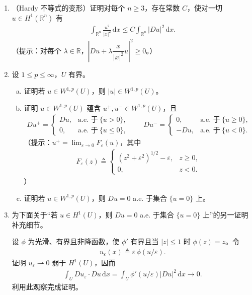 \documentclass[../../main.tex]{subfiles}
\begin{document}
\begin{enumerate}
\item （Hardy 不等式的变形）证明对每个 $n\geqslant 3$，存在常数 $C$，使对一切 $u\in H^{1}(\mathbb{R}^{n})$ 有
\begin{align*}
\int_{\mathbb{R}^{n}}\frac{u^{2}}{|x|^{2}}\,\mathrm{d}x\leqslant C\int_{\mathbb{R}^{n}}|Du|^{2}\,\mathrm{d}x.
\end{align*}
（提示：对每个 $\lambda\in\mathbb{R}$，$|Du+\lambda\dfrac{x}{|x|^{2}}u|^{2}\geqslant 0$。）

\item 设 $1\leqslant p\leqslant\infty$，$U$ 有界。
\begin{enumerate}[(a)]
\item 证明若 $u\in W^{1,p}(U)$，则 $|u|\in W^{1,p}(U)$。
\item 证明 $u\in W^{1,p}(U)$ 蕴含 $u^{+},u^{-}\in W^{1,p}(U)$，且
\begin{align*}
Du^{+}=
\begin{cases}
Du, & \text{a.e. 于}\ \{u>0\},\\
0, & \text{a.e. 于}\ \{u\leqslant 0\},
\end{cases}
\qquad
Du^{-}=
\begin{cases}
0, & \text{a.e. 于}\ \{u\geqslant 0\},\\
-Du, & \text{a.e. 于}\ \{u<0\}.
\end{cases}
\end{align*}
（提示：$u^{+}=\lim_{\varepsilon\to 0}F_{\varepsilon}(u)$，其中
\begin{align*}
F_{\varepsilon}(z)\triangleq
\begin{cases}
(z^{2}+\varepsilon^{2})^{1/2}-\varepsilon, & z\geqslant 0,\\
0, & z<0.
\end{cases}
\end{align*}
）
\item 证明若 $u\in W^{1,p}(U)$，则 $Du=0$ a.e. 于集合 $\{u=0\}$ 上。
\end{enumerate}

\item 为下面关于“若 $u\in H^{1}(U)$，则 $Du=0$ a.e. 于集合 $\{u=0\}$ 上”的另一证明补充细节。

设 $\phi$ 为光滑、有界且非降函数，使 $\phi'$ 有界且当 $|z|\leqslant 1$ 时 $\phi(z)=z$。令
\begin{align*}
u_{\varepsilon}(x)\triangleq\varepsilon\,\phi(u/\varepsilon).
\end{align*}
证明 $u_{\varepsilon}\rightharpoonup 0$ 弱于 $H^{1}(U)$，因而
\begin{align*}
\int_{U}Du_{\varepsilon}\cdot Du\,\mathrm{d}x=\int_{U}\phi'(u/\varepsilon)|Du|^{2}\,\mathrm{d}x\to 0.
\end{align*}
利用此观察完成证明。


\end{enumerate}
\end{document}
